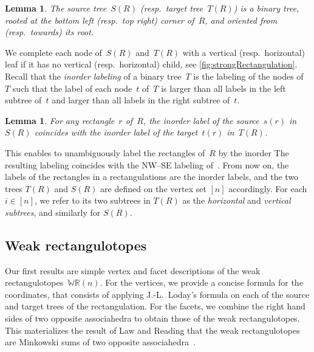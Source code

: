 \documentclass{amsart}
\newtheorem{lemma}[theorem]{Lemma}
\theoremstyle{definition}
\newcommand{\darkblue}{\color{darkblue}} %
\newcommand{\defn}[1]{\textsl{\darkblue #1}} %
\newcommand{\polytope}[1]{\mathds{#1}} %
\newcommand{\WRP}{\polytope{WR}} %
\begin{document}
\begin{lemma}
The source tree~$S(R)$ (resp.~target tree~$T(R)$) is a binary tree, rooted at the bottom left (resp.~top right) corner of~$R$, and oriented from (resp.~towards) its root.
\end{lemma}

We complete each node of~$S(R)$ and~$T(R)$ with a vertical (resp.~horizontal) leaf if it has no vertical (resp.~horizontal) child, see \cref{fig:strongRectangulation}.
Recall that the \defn{inorder labeling} of a binary tree~$T$ is the labeling of the nodes of~$T$ such that the label of each node~$t$ of~$T$ is larger than all labels in the left subtree of~$t$ and larger than all labels in the right subtree of~$t$.

\begin{lemma}
For any rectangle~$r$ of~$R$, the inorder label of the source~$s(r)$ in~$S(R)$ coincides with the inorder label of the target~$t(r)$ in~$T(R)$.
\end{lemma}

This enables to unambiguously label the rectangles of~$R$ by the inorder 
The resulting labeling coincides with the NW--SE labeling of~\cite{ACFF24}.
From now on, the labels of the rectangles in a rectangulations are the inorder labels, and the two trees $T(R)$ and $S(R)$ are defined on the vertex set $[n]$ accordingly.
For each $i\in [n]$, we refer to its two subtrees in $T(R)$ as the \defn{horizontal} and \defn{vertical subtrees}, and similarly for $S(R)$.

\subsection{Weak rectangulotopes}

Our first results are simple vertex and facet descriptions of the weak rectangulotopes~$\WRP(n)$.
For the vertices, we provide a concise formula for the coordinates, that consists of applying J.-L.~Loday's formula on each of the source and target trees of the rectangulation.
For the facets, we combine the right hand sides of two opposite associahedra to obtain those of the weak rectangulotopes.
This materializes the result of Law and Reading that the weak rectangulotopes are Minkowski sums of two opposite associahedra~\cite{MR2871762}.
\end{document}
